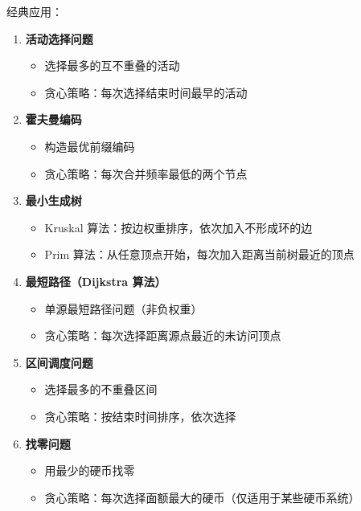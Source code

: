 经典应用：
\begin{enumerate}
  \item \textbf{活动选择问题}
    \begin{itemize}
      \item 选择最多的互不重叠的活动
      \item 贪心策略：每次选择结束时间最早的活动
    \end{itemize}

  \item \textbf{霍夫曼编码}
    \begin{itemize}
      \item 构造最优前缀编码
      \item 贪心策略：每次合并频率最低的两个节点
    \end{itemize}

  \item \textbf{最小生成树}
    \begin{itemize}
      \item Kruskal 算法：按边权重排序，依次加入不形成环的边
      \item Prim 算法：从任意顶点开始，每次加入距离当前树最近的顶点
    \end{itemize}

  \item \textbf{最短路径（Dijkstra 算法）}
    \begin{itemize}
      \item 单源最短路径问题（非负权重）
      \item 贪心策略：每次选择距离源点最近的未访问顶点
    \end{itemize}

  \item \textbf{区间调度问题}
    \begin{itemize}
      \item 选择最多的不重叠区间
      \item 贪心策略：按结束时间排序，依次选择
    \end{itemize}

  \item \textbf{找零问题}
    \begin{itemize}
      \item 用最少的硬币找零
      \item 贪心策略：每次选择面额最大的硬币（仅适用于某些硬币系统）
    \end{itemize}
\end{enumerate}

